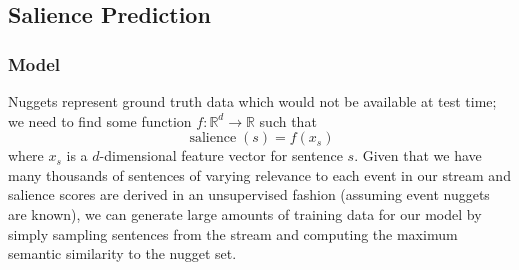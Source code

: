 
%

\subsection{Salience Prediction}
\label{sec:salpred}

\subsubsection{Model}

Nuggets represent ground truth data which would not be available at test time;
we need to find some function $f : \mathbb{R}^d \rightarrow \mathbb{R}$ 
such that 
\[ \operatorname{salience}(s) = f(x_s) \]
where $x_s$ is a $d$-dimensional feature vector for sentence $s$. 
Given that we have many thousands of sentences of varying relevance to each
event in our stream and salience scores are derived in an unsupervised fashion
(assuming event nuggets are known), we can generate large amounts of training
data for our model by simply sampling sentences 
from the stream and computing the maximum
semantic similarity to the nugget set.

